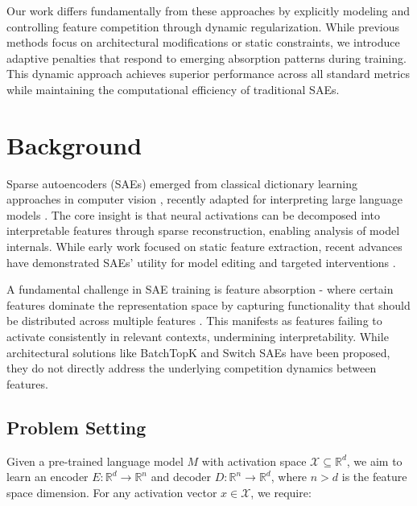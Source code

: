 \documentclass{article} %
\begin{document}
Our work differs fundamentally from these approaches by explicitly modeling and controlling feature competition through dynamic regularization. While previous methods focus on architectural modifications or static constraints, we introduce adaptive penalties that respond to emerging absorption patterns during training. This dynamic approach achieves superior performance across all standard metrics while maintaining the computational efficiency of traditional SAEs.

\section{Background}
\label{sec:background}

Sparse autoencoders (SAEs) emerged from classical dictionary learning approaches in computer vision \citep{Zhou2017InterpretingDV}, recently adapted for interpreting large language models \citep{gaoScalingEvaluatingSparse}. The core insight is that neural activations can be decomposed into interpretable features through sparse reconstruction, enabling analysis of model internals. While early work focused on static feature extraction, recent advances have demonstrated SAEs' utility for model editing \citep{marksSparseFeatureCircuits2024} and targeted interventions \citep{karvonenEvaluatingSparseAutoencoders2024}.

A fundamental challenge in SAE training is feature absorption - where certain features dominate the representation space by capturing functionality that should be distributed across multiple features \citep{chaninAbsorptionStudyingFeature2024}. This manifests as features failing to activate consistently in relevant contexts, undermining interpretability. While architectural solutions like BatchTopK \citep{bussmannBatchTopKSparseAutoencoders2024} and Switch SAEs \citep{mudideEfficientDictionaryLearning2024a} have been proposed, they do not directly address the underlying competition dynamics between features.

\subsection{Problem Setting}
\label{subsec:problem}

Given a pre-trained language model $M$ with activation space $\mathcal{X} \subseteq \mathbb{R}^d$, we aim to learn an encoder $E: \mathbb{R}^d \rightarrow \mathbb{R}^n$ and decoder $D: \mathbb{R}^n \rightarrow \mathbb{R}^d$, where $n > d$ is the feature space dimension. For any activation vector $x \in \mathcal{X}$, we require:
\end{document}
